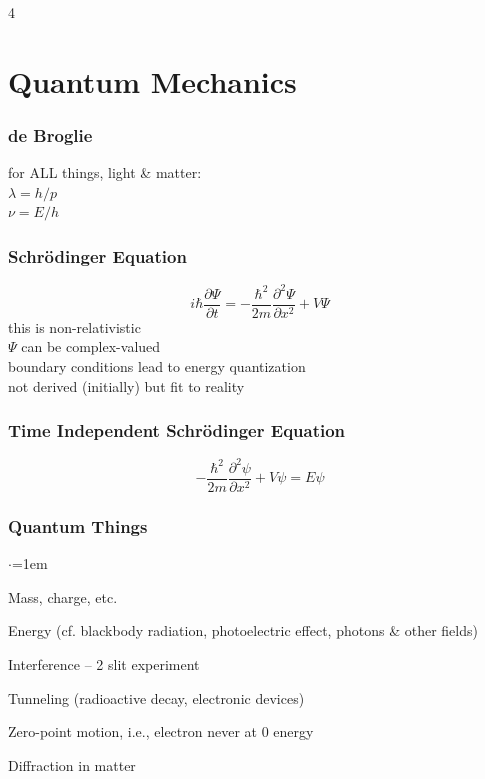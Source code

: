 \documentclass[letterpaper,landscape,10pt]{article}
\newenvironment{titemize}
{\begin{list}{$\cdot$}{\leftmargin=1em}
	\setlength{\itemsep}{0pt}
	\setlength{\parskip}{0pt}
	\setlength{\parsep}{0pt}}
{\end{list}}
\begin{document}
{\begin{multicols}{4}
\section*{Quantum Mechanics}
  \subsubsection*{de Broglie}
	\hspace{5pt}for ALL things, light \& matter: \\
	\hspace{15pt}$\lambda=h/p$ \\
	\hspace{15pt}$\nu=E/h$
  \subsubsection*{Schr\"odinger Equation}
  	$$ i\hbar\frac{\partial\Psi}{\partial t} = -\frac{\hbar^2}{2m}\frac{\partial^2\Psi}{\partial x^2} + V\Psi$$
	\hspace{5pt}this is non-relativistic\\
	\hspace{5pt}$\Psi$ can be complex-valued\\
	\hspace{5pt}boundary conditions lead to energy quantization\\
	\hspace{5pt}not derived (initially) but fit to reality\\
  \subsubsection*{Time Independent Schr\"odinger Equation}
  	$$ -\frac{\hbar^2}{2m}\frac{\partial^2\psi}{\partial x^2} + V\psi = E\psi$$
  \subsubsection*{Quantum Things}
  	\begin{titemize}
  	  \item Mass, charge, etc.
	  \item Energy (cf. blackbody radiation, photoelectric effect,
		  photons \& other fields)
	  \item Interference -- 2 slit experiment
  	  \item Tunneling (radioactive decay, electronic devices)
  	  \item Zero-point motion, i.e., electron never at 0 energy 
  	  \item Diffraction in matter
  	\end{titemize}

\end{multicols}}
\end{document}
